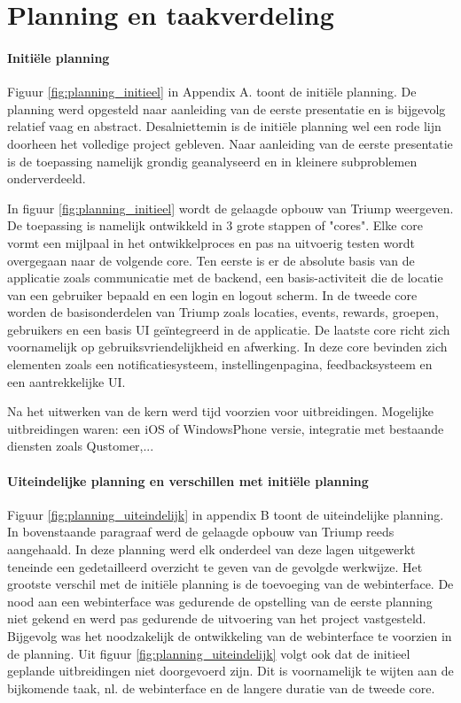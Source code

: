 
\chapter{Planning en taakverdeling}


\subsubsection{Initiële planning}

Figuur \ref{fig:planning_initieel} in Appendix A. toont de initiële planning. De planning werd opgesteld naar aanleiding van de eerste presentatie en is bijgevolg relatief vaag en abstract. Desalniettemin is de initiële planning wel een rode lijn doorheen het volledige project gebleven. Naar aanleiding van de eerste presentatie is de toepassing namelijk grondig geanalyseerd en in kleinere subproblemen onderverdeeld.

In figuur \ref{fig:planning_initieel} wordt de gelaagde opbouw van Triump weergeven. De toepassing is namelijk ontwikkeld in 3 grote stappen of "cores". Elke core vormt een mijlpaal in het ontwikkelproces en pas na uitvoerig testen wordt overgegaan naar de volgende core. 
Ten eerste is er de absolute basis van de applicatie zoals communicatie met de backend, een basis-activiteit die de locatie van een gebruiker bepaald en een login en logout scherm. In de tweede core worden de basisonderdelen van Triump zoals locaties, events, rewards, groepen, gebruikers en een basis UI geïntegreerd in de applicatie. De laatste core richt zich voornamelijk op gebruiksvriendelijkheid en afwerking. In deze core bevinden zich elementen zoals een notificatiesysteem, instellingenpagina, feedbacksysteem en een aantrekkelijke UI.

Na het uitwerken van de kern werd tijd voorzien voor uitbreidingen. Mogelijke uitbreidingen waren: een iOS of WindowsPhone versie, integratie met bestaande diensten zoals Qustomer,... 

\subsubsection{Uiteindelijke planning en verschillen met initiële planning}

Figuur \ref{fig:planning_uiteindelijk} in appendix B toont de uiteindelijke planning. In bovenstaande paragraaf werd de gelaagde opbouw van Triump reeds aangehaald. In deze planning werd elk onderdeel van deze lagen uitgewerkt teneinde een gedetailleerd overzicht te geven van de gevolgde werkwijze. Het grootste verschil met de initiële planning is de toevoeging van de webinterface. De nood aan een webinterface was gedurende de opstelling van de eerste planning niet gekend en werd pas gedurende de uitvoering van het project vastgesteld. Bijgevolg was het noodzakelijk de ontwikkeling van de webinterface te voorzien in de planning. 
Uit figuur \ref{fig:planning_uiteindelijk} volgt ook dat de initieel geplande uitbreidingen niet doorgevoerd zijn. Dit is voornamelijk te wijten aan de bijkomende taak, nl. de webinterface en de langere duratie van de tweede core.

